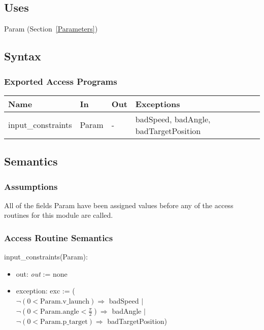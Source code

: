 \documentclass[12pt, titlepage]{article}
\begin{document}
\subsection{Uses}

Param (Section~\ref{Parameters})

\subsection{Syntax}

\subsubsection{Exported Access Programs}

\begin{center}
 \begin{tabular}{p{3cm} p{3cm} p{1cm} p{8cm}}
 \hline
 \textbf{Name} & \textbf{In} & \textbf{Out} & \textbf{Exceptions} \\
 \hline
 input\_constraints & Param & - & badSpeed, badAngle, badTargetPosition \\
 \hline
 \end{tabular}
 \end{center}

\subsection{Semantics}

\subsubsection{Assumptions}

All of the fields Param have been assigned values before any of the access
 routines for this module are called.

\subsubsection{Access Routine Semantics}

input\_constraints(Param):
 \begin{itemize}
 \item out: \textit{out} := none
 \item exception: exc := ( \\
 $\neg (0 < \text{Param.v\_launch}) \Rightarrow$ badSpeed $|$\\
 $\neg (0 < \text{Param.angle} < \frac{\pi}{2}) \Rightarrow$ badAngle $|$\\
 $\neg (0 < \text{Param.p\_target}) \Rightarrow$ badTargetPosition)
 \end{itemize}
\end{document}

